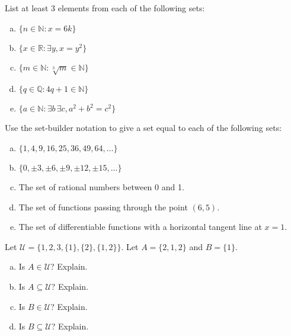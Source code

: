 \documentclass[11pt,letterpaper]{article}
\begin{document}
\homework{}

 List at least 3 elements from each of the following sets:
        \begin{enumerate}[(a)]
        \item $\{ n \in \mathbb{N} \colon x= 6k \}$
        \item $\{ x \in \mathbb{R} \colon \exists y, x= y^2 \}$
        \item $\{ m \in \mathbb{N} \colon \sqrt[3]{m} \in \mathbb{N} \}$
        \item $\{ q \in \mathbb{Q} \colon 4q + 1 \in \mathbb{N} \}$
        \item $\{ a \in \mathbb{N} \colon \exists b\, \exists c, a^2 + b^2= c^2 \}$
        \end{enumerate}





\newpage





 Use the set-builder notation to give a set equal to each of the following sets:
        \begin{enumerate}[(a)]
        \item $\{ 1, 4, 9, 16, 25, 36, 49, 64, \ldots \}$
        \item $\{ 0, \pm 3, \pm 6, \pm 9, \pm 12, \pm 15, \ldots \}$
        \item The set of rational numbers between 0 and 1.  
        \item The set of functions passing through the point $(6, 5)$. 
        \item The set of differentiable functions with a horizontal tangent line at $x= 1$.
        \end{enumerate}





\newpage





 Let $\mathscr{U}= \{ 1, 2, 3, \{1\}, \{2\}, \{1,2\} \}$. Let $A= \{ 2, 1, 2 \}$ and $B= \{ 1 \}$. 
	\begin{enumerate}[(a)]
	\item Is $A \in \mathscr{U}$? Explain.
	\item Is $A \subseteq \mathscr{U}$? Explain.
	\item Is $B \in \mathscr{U}$? Explain. 
	\item Is $B \subseteq \mathscr{U}$? Explain. 
	\end{enumerate}
\end{document}
